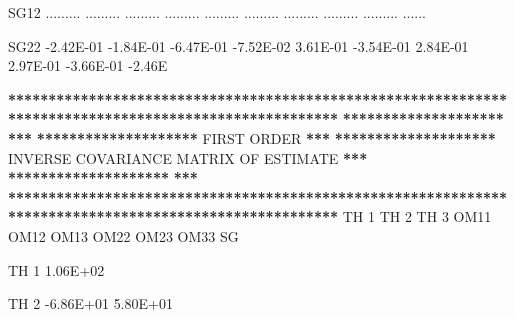 \documentclass[
  11pt,
  krantz2,
  a4paper]{krantz}
\newenvironment{Shaded}{\begin{snugshade}}{\end{snugshade}}
\newcommand{\DecValTok}[1]{\textcolor[rgb]{0.00,0.00,0.81}{#1}}
\newcommand{\ErrorTok}[1]{\textcolor[rgb]{0.64,0.00,0.00}{\textbf{#1}}}
\newcommand{\FloatTok}[1]{\textcolor[rgb]{0.00,0.00,0.81}{#1}}
\newcommand{\NormalTok}[1]{#1}
\newcommand{\OperatorTok}[1]{\textcolor[rgb]{0.81,0.36,0.00}{\textbf{#1}}}
\newcommand{\StringTok}[1]{\textcolor[rgb]{0.31,0.60,0.02}{#1}}
\theoremstyle{definition}
\theoremstyle{definition}
\theoremstyle{definition}
\theoremstyle{remark}
\begin{document}
\begin{Shaded}
\begin{Highlighting}[]
\NormalTok{SG12   ......... ......... ......... ......... ......... ......... ......... ......... ......... ......}
                                                                                                       
\NormalTok{SG22   }\FloatTok{{-}2.42E{-}01} \FloatTok{{-}1.84E{-}01} \FloatTok{{-}6.47E{-}01} \FloatTok{{-}7.52E{-}02}  \FloatTok{3.61E{-}01} \FloatTok{{-}3.54E{-}01}  \FloatTok{2.84E{-}01}  \FloatTok{2.97E{-}01} \FloatTok{{-}3.66E{-}01} \FloatTok{{-}2.46}\NormalTok{E}
                                                                                                       
                                                                                                       
\OperatorTok{**}\ErrorTok{*****************************************************************************************************}
\ErrorTok{********************}\StringTok{                                                                                }\ErrorTok{***}
\ErrorTok{********************}\StringTok{                                   }\NormalTok{FIRST ORDER                                  }\OperatorTok{**}\ErrorTok{*}
\ErrorTok{********************}\StringTok{                      }\NormalTok{INVERSE COVARIANCE MATRIX OF ESTIMATE                     }\OperatorTok{**}\ErrorTok{*}
\ErrorTok{********************}\StringTok{                                                                                }\ErrorTok{***}
\ErrorTok{*******************************************************************************************************}
\StringTok{                                                                                                       }
\StringTok{                                                                                                       }
\StringTok{           }\NormalTok{TH }\DecValTok{1}\NormalTok{      TH }\DecValTok{2}\NormalTok{      TH }\DecValTok{3}\NormalTok{      OM11      OM12      OM13      OM22      OM23      OM33      SG}
                                                                                                       
                                                                                                       
\NormalTok{TH }\DecValTok{1}    \FloatTok{1.06E+02}                                                                                       
                                                                                                       
\NormalTok{TH }\DecValTok{2}   \FloatTok{{-}6.86E+01}  \FloatTok{5.80E+01}                                                                             
                                                                                                       

\end{Highlighting}
\end{Shaded}
\end{document}

